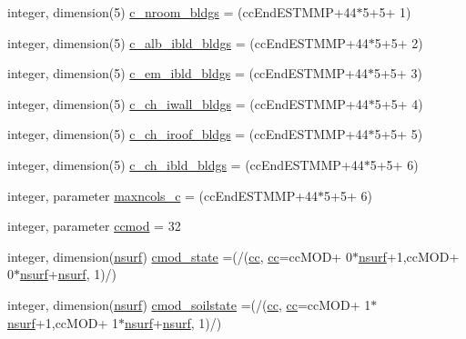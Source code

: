 \begin{DoxyCompactItemize}
\item 
integer, dimension(5) \hyperlink{namespaceallocatearray_ab1dd7a48c1507d9047274aaa6099894a}{c\+\_\+nroom\+\_\+bldgs} = (cc\+End\+E\+S\+T\+M\+MP+44$\ast$5+5+ 1)
\item 
integer, dimension(5) \hyperlink{namespaceallocatearray_ada09598f015c239e9865188f8d58d9af}{c\+\_\+alb\+\_\+ibld\+\_\+bldgs} = (cc\+End\+E\+S\+T\+M\+MP+44$\ast$5+5+ 2)
\item 
integer, dimension(5) \hyperlink{namespaceallocatearray_ace6f070ae177c567fe76c17bb91034ef}{c\+\_\+em\+\_\+ibld\+\_\+bldgs} = (cc\+End\+E\+S\+T\+M\+MP+44$\ast$5+5+ 3)
\item 
integer, dimension(5) \hyperlink{namespaceallocatearray_a156720ee5527b3a9701d9ad18698e8b6}{c\+\_\+ch\+\_\+iwall\+\_\+bldgs} = (cc\+End\+E\+S\+T\+M\+MP+44$\ast$5+5+ 4)
\item 
integer, dimension(5) \hyperlink{namespaceallocatearray_a46eeb6c1e9d75b2402799845e833d5e7}{c\+\_\+ch\+\_\+iroof\+\_\+bldgs} = (cc\+End\+E\+S\+T\+M\+MP+44$\ast$5+5+ 5)
\item 
integer, dimension(5) \hyperlink{namespaceallocatearray_a35459b33135ea1d0051778a726c8e1e9}{c\+\_\+ch\+\_\+ibld\+\_\+bldgs} = (cc\+End\+E\+S\+T\+M\+MP+44$\ast$5+5+ 6)
\item 
integer, parameter \hyperlink{namespaceallocatearray_a733b5ec7d7c0cf4c5407515ed555251f}{maxncols\+\_\+c} = (cc\+End\+E\+S\+T\+M\+MP+44$\ast$5+5+ 6)
\item 
integer, parameter \hyperlink{namespaceallocatearray_a93cbccce6abf3ac7e437099b001937d2}{ccmod} = 32
\item 
integer, dimension(\hyperlink{namespaceallocatearray_acd22f92a06f7e9a2a91426b3dc99fdb0}{nsurf}) \hyperlink{namespaceallocatearray_ada5fca539fc9eb27ca314e4c9994c4dd}{cmod\+\_\+state} =(/(\hyperlink{namespaceallocatearray_ac863c81704eb507dee10f5e10741e10c}{cc}, \hyperlink{namespaceallocatearray_ac863c81704eb507dee10f5e10741e10c}{cc}=cc\+M\+OD+ 0$\ast$\hyperlink{namespaceallocatearray_acd22f92a06f7e9a2a91426b3dc99fdb0}{nsurf}+1,cc\+M\+OD+ 0$\ast$\hyperlink{namespaceallocatearray_acd22f92a06f7e9a2a91426b3dc99fdb0}{nsurf}+\hyperlink{namespaceallocatearray_acd22f92a06f7e9a2a91426b3dc99fdb0}{nsurf}, 1)/)
\item 
integer, dimension(\hyperlink{namespaceallocatearray_acd22f92a06f7e9a2a91426b3dc99fdb0}{nsurf}) \hyperlink{namespaceallocatearray_abc11b77f7e2b79059d31a63ef02209f7}{cmod\+\_\+soilstate} =(/(\hyperlink{namespaceallocatearray_ac863c81704eb507dee10f5e10741e10c}{cc}, \hyperlink{namespaceallocatearray_ac863c81704eb507dee10f5e10741e10c}{cc}=cc\+M\+OD+ 1$\ast$\hyperlink{namespaceallocatearray_acd22f92a06f7e9a2a91426b3dc99fdb0}{nsurf}+1,cc\+M\+OD+ 1$\ast$\hyperlink{namespaceallocatearray_acd22f92a06f7e9a2a91426b3dc99fdb0}{nsurf}+\hyperlink{namespaceallocatearray_acd22f92a06f7e9a2a91426b3dc99fdb0}{nsurf}, 1)/)

\end{DoxyCompactItemize}
